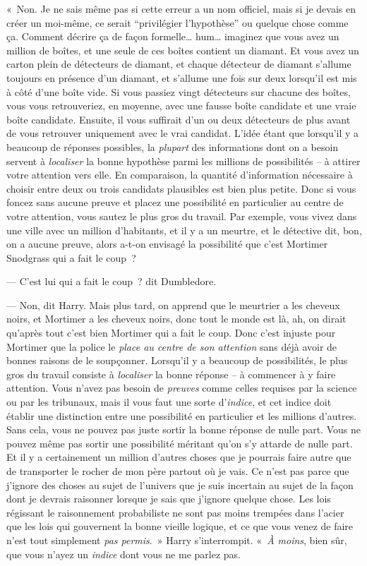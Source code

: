 «~Non. Je ne sais même pas si cette erreur a un nom officiel, mais si je devais en créer un moi-même, ce serait “privilégier l'hypothèse” ou quelque chose comme ça. Comment décrire ça de façon formelle… hum… imaginez que vous avez un million de boîtes, et une seule de ces boîtes contient un diamant. Et vous avez un carton plein de détecteurs de diamant, et chaque détecteur de diamant s'allume toujours en présence d'un diamant, et s'allume une fois sur deux lorsqu'il est mis à côté d'une boîte vide. Si vous passiez vingt détecteurs sur chacune des boîtes, vous vous retrouveriez, en moyenne, avec une fausse boîte candidate et une vraie boîte candidate. Ensuite, il vous suffirait d'un ou deux détecteurs de plus avant de vous retrouver uniquement avec le vrai candidat. L'idée étant que lorsqu'il y a beaucoup de réponses possibles, la \emph{plupart} des informations dont on a besoin servent à \emph{localiser} la bonne hypothèse parmi les millions de possibilités -- à attirer votre attention vers elle. En comparaison, la quantité d'information nécessaire à choisir entre deux ou trois candidats plausibles est bien plus petite. Donc si vous foncez sans aucune preuve et placez une possibilité en particulier au centre de votre attention, vous sautez le plus gros du travail. Par exemple, vous vivez dans une ville avec un million d'habitants, et il y a un meurtre, et le détective dit, bon, on a aucune preuve, alors a-t-on envisagé la possibilité que c'est Mortimer Snodgrass qui a fait le coup~?

--- C'est lui qui a fait le coup~? dit Dumbledore.

--- Non, dit Harry. Mais plus tard, on apprend que le meurtrier a les cheveux noirs, et Mortimer a les cheveux noirs, donc tout le monde est là, ah, on dirait qu'après tout c'est bien Mortimer qui a fait le coup. Donc c'est injuste pour Mortimer que la police le \emph{place au centre de son attention} sans déjà avoir de bonnes raisons de le soupçonner. Lorsqu'il y a beaucoup de possibilités, le plus gros du travail consiste à \emph{localiser} la bonne réponse -- à commencer à y faire attention. Vous n'avez pas besoin de \emph{preuves} comme celles requises par la science ou par les tribunaux, mais il vous faut une sorte d'\emph{indice}, et cet indice doit établir une distinction entre une possibilité en particulier et les millions d'autres. Sans cela, vous ne pouvez pas juste sortir la bonne réponse de nulle part. Vous ne pouvez même pas sortir une possibilité méritant qu'on s'y attarde de nulle part. Et il y a certainement un million d'autres choses que je pourrais faire autre que de transporter le rocher de mon père partout où je vais. Ce n'est pas parce que j'ignore des choses au sujet de l'univers que je suis incertain au sujet de la façon dont je devrais raisonner lorsque je sais que j'ignore quelque chose. Les lois régissant le raisonnement probabiliste ne sont pas moins trempées dans l'acier que les lois qui gouvernent la bonne vieille logique, et ce que vous venez de faire n'est tout simplement \emph{pas permis}.~» Harry s'interrompit. «~\emph{À moins}, bien sûr, que vous n'ayez un \emph{indice} dont vous ne me parlez pas.


